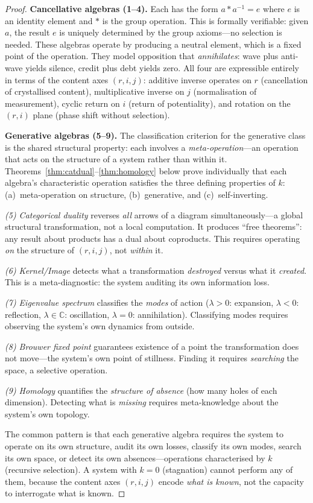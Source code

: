 \documentclass[11pt,a4paper]{article}
\newcommand{\rey}[1]{{\color{rcolor}#1}}
\newcommand{\imag}[1]{{\color{icolor}#1}}
\newcommand{\exac}[1]{{\color{jcolor}#1}}
\newcommand{\recu}[1]{{\color{kcolor}#1}}
\def\rey#1{#1}%
\def\imag#1{#1}%
\def\exac#1{#1}%
\def\recu#1{#1}%
\begin{document}
\begin{proof}
\textbf{Cancellative algebras (1--4).} Each has the form $a \ast
a^{-1} = e$ where $e$ is an identity element and $\ast$ is the group
operation. This is formally verifiable: given $a$, the result $e$ is
uniquely determined by the group axioms---no selection is needed.
These algebras operate by producing a neutral element, which is a
fixed point of the operation. They model opposition that
\emph{annihilates}: wave plus anti-wave yields silence, credit plus
debt yields zero. All four are expressible entirely in terms of the
content axes $(\rey{r}, \imag{i}, \exac{j})$: additive inverse
operates on $\rey{r}$ (cancellation of crystallised content),
multiplicative inverse on $\exac{j}$ (normalisation of measurement),
cyclic return on $\imag{i}$ (return of potentiality), and rotation on
the $(\rey{r}, \imag{i})$ plane (phase shift without selection).

\textbf{Generative algebras (5--9).}
The classification criterion for the generative class is the
shared structural property: each involves a
\emph{meta-operation}---an operation that acts on the structure
of a system rather than within it.
Theorems~\ref{thm:catdual}--\ref{thm:homology} below prove
individually that each algebra's characteristic operation satisfies
the three defining properties of $\recu{k}$: (a)~meta-operation
on structure, (b)~generative, and (c)~self-inverting.

\emph{(5) Categorical duality} reverses \emph{all} arrows of a
diagram simultaneously---a global structural transformation, not a
local computation. It produces ``free theorems'': any result about
products has a dual about coproducts. This requires operating
\emph{on} the structure of $(r,i,j)$, not \emph{within} it.

\emph{(6) Kernel/Image} detects what a transformation
\emph{destroyed} versus what it \emph{created}. This is a
meta-diagnostic: the system auditing its own information loss.

\emph{(7) Eigenvalue spectrum} classifies the \emph{modes} of action
($\lambda > 0$: expansion, $\lambda < 0$: reflection, $\lambda \in
\mathbb{C}$: oscillation, $\lambda = 0$: annihilation). Classifying
modes requires observing the system's own dynamics from outside.

\emph{(8) Brouwer fixed point} guarantees existence of a point the
transformation does not move---the system's own point of stillness.
Finding it requires \emph{searching} the space, a selective operation.

\emph{(9) Homology} quantifies the \emph{structure of absence} (how
many holes of each dimension). Detecting what is \emph{missing}
requires meta-knowledge about the system's own topology.

The common pattern is that each generative algebra requires the
system to operate on its own structure, audit its own losses,
classify its own modes, search its own space, or detect its own
absences---operations characterised by $\recu{k}$ (recursive
selection). A system with $k = 0$ (stagnation) cannot perform any
of them, because the content axes $(\rey{r}, \imag{i}, \exac{j})$
encode \emph{what is known}, not the capacity to interrogate what
is known.
\end{proof}
\end{document}
